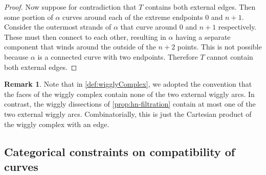 \documentclass{amsart}
\theoremstyle{definition}
\newtheorem{remark}[theorem]{Remark}
\begin{document}
\begin{proof}
  Now suppose for contradiction that \(T\) contains both external edges.
  Then some portion of \(\alpha\) curves around each of the extreme endpoints \(0\) and \(n+1\).
  Consider the outermost strands of \(\alpha\) that curve around \(0\) and \(n+1\) respectively.
  These must then connect to each other, resulting in \(\alpha\) having a separate component that winds around the outside of the \(n+2\) points.
  This is not possible because \(\alpha\) is a connected curve with two endpoints.
  Therefore \(T\) cannot contain both external edges.
\end{proof}

\begin{remark}
Note that in \cref{def:wigglyComplex}, we adopted the convention that the faces of the wiggly complex contain none of the two external wiggly arcs.
In contrast, the wiggly dissections of \cref{prop:hn-filtration} contain at most one of the two external wiggly arcs.
Combinatorially, this is just the Cartesian product of the wiggly complex with an edge.
\end{remark}


\subsection{Categorical constraints on compatibility of curves}
\end{document}

